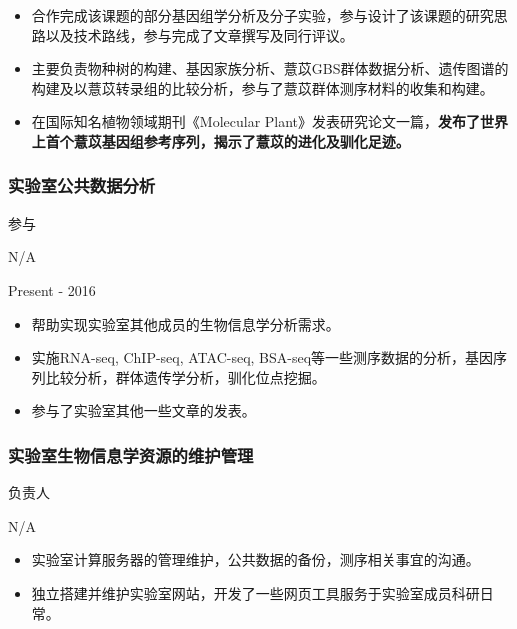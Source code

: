 \documentclass[]{article}
\providecommand{\tightlist}{%
  \setlength{\itemsep}{0pt}\setlength{\parskip}{0pt}}
\begin{document}
\begin{itemize}
\tightlist
\item
  合作完成该课题的部分基因组学分析及分子实验，参与设计了该课题的研究思路以及技术路线，参与完成了文章撰写及同行评议。
\item
  主要负责物种树的构建、基因家族分析、薏苡GBS群体数据分析、遗传图谱的构建及以薏苡转录组的比较分析，参与了薏苡群体测序材料的收集和构建。
\item
  在国际知名植物领域期刊《Molecular
  Plant》发表研究论文一篇，\textbf{发布了世界上首个薏苡基因组参考序列，揭示了薏苡的进化及驯化足迹。}
\end{itemize}

\hypertarget{ux5b9eux9a8cux5ba4ux516cux5171ux6570ux636eux5206ux6790}{%
\subsubsection{实验室公共数据分析}\label{ux5b9eux9a8cux5ba4ux516cux5171ux6570ux636eux5206ux6790}}

参与

N/A

Present - 2016

\begin{itemize}
\tightlist
\item
  帮助实现实验室其他成员的生物信息学分析需求。
\item
  实施RNA-seq, ChIP-seq, ATAC-seq,
  BSA-seq等一些测序数据的分析，基因序列比较分析，群体遗传学分析，驯化位点挖掘。
\item
  参与了实验室其他一些文章的发表。
\end{itemize}

\hypertarget{ux5b9eux9a8cux5ba4ux751fux7269ux4fe1ux606fux5b66ux8d44ux6e90ux7684ux7ef4ux62a4ux7ba1ux7406}{%
\subsubsection{实验室生物信息学资源的维护管理}\label{ux5b9eux9a8cux5ba4ux751fux7269ux4fe1ux606fux5b66ux8d44ux6e90ux7684ux7ef4ux62a4ux7ba1ux7406}}

负责人

N/A

\begin{itemize}
\tightlist
\item
  实验室计算服务器的管理维护，公共数据的备份，测序相关事宜的沟通。
\item
  独立搭建并维护实验室网站，开发了一些网页工具服务于实验室成员科研日常。
\end{itemize}
\end{document}
